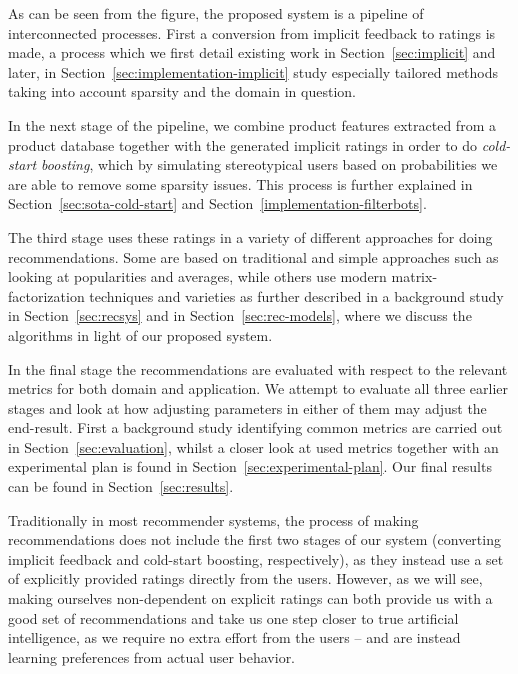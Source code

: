 As can be seen from the figure, the proposed system is a pipeline of
interconnected processes. First a conversion from implicit feedback to ratings
is made, a process which we first detail existing work in
Section~\ref{sec:implicit} and later, in
Section~\ref{sec:implementation-implicit} study especially tailored methods
taking into account sparsity and the domain in question.

In the next stage of the pipeline, we combine product features extracted from a
product database together with the generated implicit ratings in order to do
\textit{cold-start boosting}, which by simulating stereotypical users based on
probabilities we are able to remove some sparsity issues. This process is
further explained in Section~\ref{sec:sota-cold-start} and
Section~\ref{implementation-filterbots}.

The third stage uses these ratings in a variety of different approaches for
doing recommendations. Some are based on traditional and simple approaches such
as looking at popularities and averages, while others use modern
matrix-factorization techniques and varieties as further described in a
background study in Section~\ref{sec:recsys} and in
Section~\ref{sec:rec-models}, where we discuss the algorithms in light of our
proposed system.

In the final stage the recommendations are evaluated with respect to the
relevant metrics for both domain and application. We attempt to evaluate all
three earlier stages and look at how adjusting parameters in either of them may
adjust the end-result. First a background study identifying common metrics are
carried out in Section~\ref{sec:evaluation}, whilst a closer look at used
metrics together with an experimental plan is found in
Section~\ref{sec:experimental-plan}. Our final results can be found in
Section~\ref{sec:results}.

Traditionally in most recommender systems, the process of making
recommendations does not include the first two stages of our system (converting
implicit feedback and cold-start boosting, respectively), as they instead use a
set of explicitly provided ratings directly from the users. However, as we will
see, making ourselves non-dependent on explicit ratings can both provide us
with a good set of recommendations and take us one step closer to true
artificial intelligence, as we require no extra effort from the users -- and are
instead learning preferences from actual user behavior.

